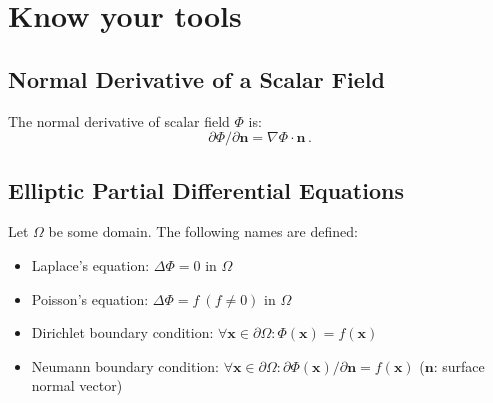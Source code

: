 \chapter{Know your tools}

\FloatBarrier
\section{Normal Derivative of a Scalar Field}
The normal derivative of scalar field $\Phi$ is:
\begin{equation}
  \partial \Phi / \partial \mathbf{n} = \nabla \Phi \cdot \mathbf{n} \, .
\end{equation}

\FloatBarrier
\section{Elliptic Partial Differential Equations}
Let $\Omega$ be some domain.
The following names are defined:
\begin{itemize}
  \item Laplace's equation: $\Delta \Phi = 0$ in $\Omega$ \\
  \item Poisson's equation: $\Delta \Phi = f ~(f\neq0)$ in $\Omega$ \\
  \item Dirichlet boundary condition: $\forall \mathbf{x} \in \partial\Omega:          \Phi(\mathbf{x})                       = f(\mathbf{x})$ \\
  \item Neumann boundary condition:   $\forall \mathbf{x} \in \partial\Omega: \partial \Phi(\mathbf{x}) / \partial \mathbf{n} = f(\mathbf{x})$ ($\mathbf{n}$: surface normal vector)
\end{itemize}

\FloatBarrier
